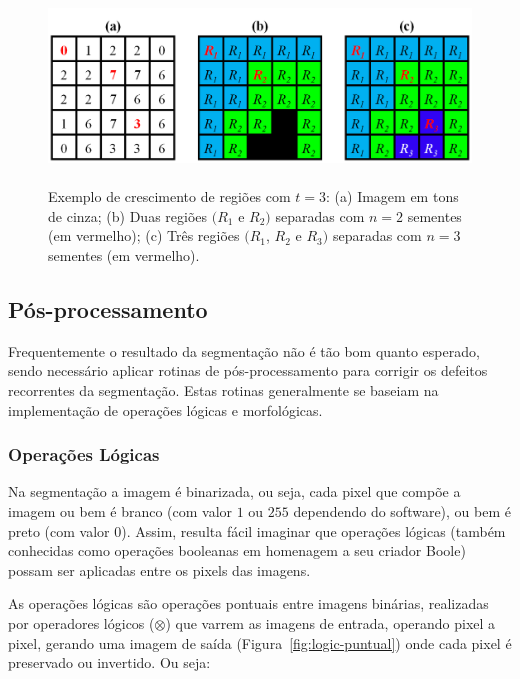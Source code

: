 \begin{figure} [h]
  \begin{center}
    \includegraphics[height=146pt,width=400pt]{images/fig_ex-cresregio}
    \caption{Exemplo de crescimento de regiões com $t =3$: (a) Imagem
      em tons de cinza; (b) Duas regiões $(R_{1}$ e $R_{2})$ separadas
      com $n = 2$ sementes (em vermelho); (c) Três regiões $(R_{1}$,
      $R_{2}$ e $R_{3})$ separadas com $n = 3$ sementes (em
      vermelho).}\label{fig:ex-cresregio}
  \end{center}
\end{figure}

\subsection{Pós-processamento}

Frequentemente o resultado da segmentação não é tão bom quanto
esperado, sendo necessário aplicar rotinas de pós-processamento para
corrigir os defeitos recorrentes da segmentação. Estas rotinas
generalmente se baseiam na implementação de operações lógicas e
morfológicas.

\subsubsection{Operações Lógicas}

Na segmentação a imagem é binarizada, ou seja, cada pixel que compõe a
imagem ou bem é branco (com valor $1$ ou $255$ dependendo do
software), ou bem é preto (com valor $0$). Assim, resulta fácil
imaginar que operações lógicas (também conhecidas como operações
booleanas em homenagem a seu criador Boole) possam ser aplicadas entre
os pixels das imagens.

As operações lógicas são operações pontuais entre imagens binárias,
realizadas por operadores lógicos ($\otimes$) que varrem as imagens de
entrada, operando pixel a pixel, gerando uma imagem de saída
(Figura~\ref{fig:logic-puntual}) onde cada pixel é preservado ou
invertido.\cite{72} Ou seja:

